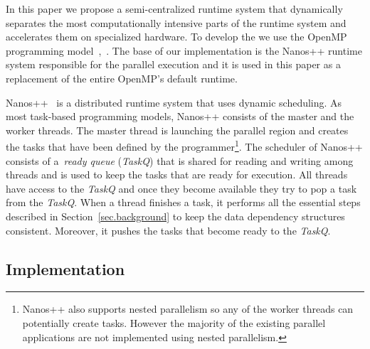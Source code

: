 

In this paper we propose a semi-centralized runtime system that dynamically separates the most computationally intensive parts of the runtime system and accelerates them on specialized hardware. 
To develop the {\proposal} we use the OpenMP programming model~\cite{OpenMP},~\cite{OpenMP4.0:Manual2015}.
The base of our implementation is the Nanos++ runtime system responsible for the parallel execution and it is used in this paper as a replacement of the entire OpenMP's default runtime.

Nanos++~\cite{nanos} is a distributed runtime system that uses dynamic scheduling.
As most task-based programming models, Nanos++ consists of the master and the worker threads.
The master thread is launching the parallel region and creates the tasks that have been defined by the programmer{\footnote{Nanos++ also supports nested parallelism so any of the worker threads can potentially create tasks. However the majority of the existing parallel applications are not implemented using nested parallelism.}}.
The scheduler of Nanos++ consists of a~\textit{ready queue} (\textit{TaskQ}) that is shared for reading and writing among threads and is used to keep the tasks that are ready for execution.
All threads have access to the \textit{TaskQ} and once they become available they try to pop a task from the \textit{TaskQ}.
When a thread finishes a task, it performs all the essential steps described in Section~\ref{sec.background} to keep the data dependency structures consistent.
Moreover, it pushes the tasks that become ready to the \textit{TaskQ}.



\subsection{Implementation}

